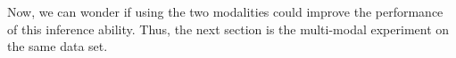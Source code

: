 \documentclass[runningheads,a4paper]{llncs}
\begin{document}
Now, we can wonder if using the two modalities could improve the performance of this inference ability. Thus, the next section is the multi-modal experiment on the same data set.
%
%
%
%
%
%
%
\end{document}
